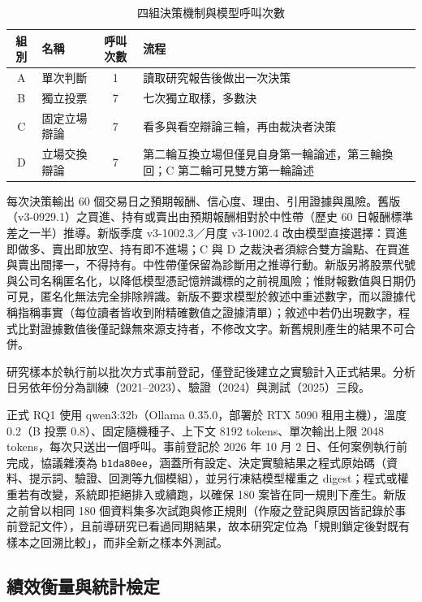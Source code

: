 \documentclass[12pt,a4paper]{article}
\newcommand{\grp}[1]{\textsf{#1}}
\begin{document}
\begin{CJK}{UTF8}{bkai}
\begin{table}[H]
\centering\small
\caption{四組決策機制與模型呼叫次數}
\label{tab:arms}
\begin{tabularx}{\textwidth}{@{}c l c Y@{}}
\toprule
組別 & 名稱 & 呼叫次數 & 流程 \\
\midrule
\grp{A} & 單次判斷 & 1 & 讀取研究報告後做出一次決策 \\
\grp{B} & 獨立投票 & 7 & 七次獨立取樣，多數決 \\
\grp{C} & 固定立場辯論 & 7 & 看多與看空辯論三輪，再由裁決者決策 \\
\grp{D} & 立場交換辯論 & 7 & 第二輪互換立場但僅見自身第一輪論述，第三輪換回；\grp{C} 第二輪可見雙方第一輪論述 \\
\bottomrule
\end{tabularx}
\end{table}

每次決策輸出 60 個交易日之預期報酬、信心度、理由、引用證據與風險。舊版（v3-0929.1）之買進、持有或賣出由預期報酬相對於中性帶（歷史 60 日報酬標準差之一半）推導。新版季度 v3-1002.3／月度 v3-1002.4 改由模型直接選擇：買進即做多、賣出即放空、持有即不進場；\grp{C} 與 \grp{D} 之裁決者須綜合雙方論點、在買進與賣出間擇一，不得持有。中性帶僅保留為診斷用之推導行動。新版另將股票代號與公司名稱匿名化，以降低模型憑記憶辨識標的之前視風險；惟財報數值與日期仍可見，匿名化無法完全排除辨識。新版不要求模型於敘述中重述數字，而以證據代稱指稱事實（每位讀者皆收到附精確數值之證據清單）；敘述中若仍出現數字，程式比對證據數值後僅記錄無來源支持者，不修改文字。新舊規則產生的結果不可合併。

研究樣本於執行前以批次方式事前登記，僅登記後建立之實驗計入正式結果。分析日另依年份分為訓練（2021--2023）、驗證（2024）與測試（2025）三段。

正式 RQ1 使用 qwen3:32b（Ollama 0.35.0，部署於 RTX 5090 租用主機），溫度 0.2（\grp{B} 投票 0.8）、固定隨機種子、上下文 8192 tokens、單次輸出上限 2048 tokens，每次只送出一個呼叫。事前登記於 2026 年 10 月 2 日、任何案例執行前完成，協議雜湊為 \texttt{b1da80ee}，涵蓋所有設定、決定實驗結果之程式原始碼（資料、提示詞、驗證、回測等九個模組），並另行凍結模型權重之 digest；程式或權重若有改變，系統即拒絕排入或續跑，以確保 180 案皆在同一規則下產生。新版之前曾以相同 180 個資料集多次試跑與修正規則（作廢之登記與原因皆記錄於事前登記文件），且前導研究已看過同期結果，故本研究定位為「規則鎖定後對既有樣本之回溯比較」，而非全新之樣本外測試。

\subsection{績效衡量與統計檢定}


\end{CJK}
\end{document}
